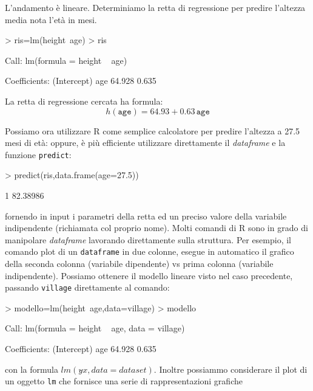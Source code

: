 \documentclass[onecolumn,12pt]{book}
\begin{document}
L'andamento \`e lineare. Determiniamo la retta di regressione
per predire l'altezza media nota l'et\`a in mesi.
\begin{Schunk}
\begin{Sinput}
> ris=lm(height~age)
> ris
\end{Sinput}
\begin{Soutput}
Call:
lm(formula = height ~ age)

Coefficients:
(Intercept)          age  
     64.928        0.635  
\end{Soutput}
\end{Schunk}

La retta di regressione cercata ha formula:
$$h(\texttt{age})=64.93+ 0.63\, \texttt{age}$$

Possiamo ora utilizzare \textsf{R} come semplice calcolatore per predire l'altezza a 27.5 mesi di et\`a:
oppure, \`e pi\`u  efficiente utilizzare direttamente il \emph{dataframe} e la funzione
\texttt{predict}:
\begin{Schunk}
\begin{Sinput}
> predict(ris,data.frame(age=27.5))
\end{Sinput}
\begin{Soutput}
       1 
82.38986 
\end{Soutput}
\end{Schunk}
fornendo in input i parametri della retta ed un preciso valore della variabile indipendente (richiamata col proprio nome).
Molti comandi di \textsf{R} sono in grado di manipolare \emph{dataframe}  lavorando direttamente sulla struttura. Per esempio, il comando plot di un \texttt{dataframe} in due colonne, esegue in automatico il grafico della seconda colonna (variabile dipendente) vs prima colonna (variabile indipendente).
Possiamo ottenere il modello lineare visto nel caso precedente, passando \texttt{village} direttamente al comando:
\begin{Schunk}
\begin{Sinput}
> modello=lm(height~age,data=village)
> modello
\end{Sinput}
\begin{Soutput}
Call:
lm(formula = height ~ age, data = village)

Coefficients:
(Intercept)          age  
     64.928        0.635  
\end{Soutput}
\end{Schunk}
con la formula $lm(y \tilde{} x,data=dataset)$.
Inoltre possiammo considerare il plot di un oggetto \texttt{lm}  che fornisce una serie di rappresentazioni grafiche
\end{document}
